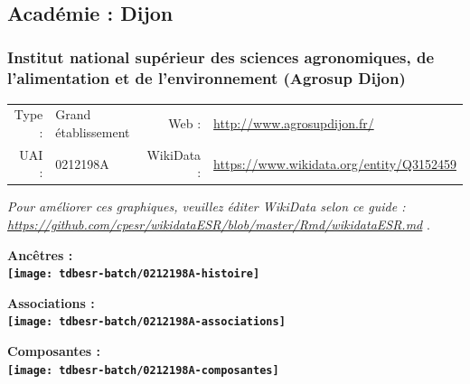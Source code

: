 \documentclass[12pt,french,]{article}
\begin{document}
\ifoddpage \fi ~\newpage  

\hypertarget{acaduxe9mie-dijon-1}{%
\subsection{Académie : Dijon}\label{acaduxe9mie-dijon-1}}

\hypertarget{institut-national-supuxe9rieur-des-sciences-agronomiques-de-lalimentation-et-de-lenvironnement-agrosup-dijon}{%
\subsubsection{Institut national supérieur des sciences agronomiques, de
l'alimentation et de l'environnement (Agrosup
Dijon)}\label{institut-national-supuxe9rieur-des-sciences-agronomiques-de-lalimentation-et-de-lenvironnement-agrosup-dijon}}

\begin{tabular*}{\textwidth}{rp{5cm}rl}  
\hline  
Type : & Grand établissement & Web : &\href{http://www.agrosupdijon.fr/}{http://www.agrosupdijon.fr/} \\  
UAI : & 0212198A & WikiData : & \href{https://www.wikidata.org/entity/Q3152459}{https://www.wikidata.org/entity/Q3152459} \\  
\hline  
\end{tabular*}

\textit{\scriptsize Pour améliorer ces graphiques, veuillez éditer WikiData selon ce guide :  \href{https://github.com/cpesr/wikidataESR/blob/master/Rmd/wikidataESR.md}{https://github.com/cpesr/wikidataESR/blob/master/Rmd/wikidataESR.md}}
.

\vspace{1cm}  
\begin{minipage}[b]{0.50\textwidth}\begin{center} \bf Ancêtres : \\  
\texttt{[image: tdbesr-batch/0212198A-histoire]} \end{center}\end{minipage}\begin{minipage}[b]{0.50\textwidth}\begin{center} \bf Associations : \\  
\texttt{[image: tdbesr-batch/0212198A-associations]} \end{center}\end{minipage}

\hrulefill

\begin{center} \bf Composantes : \\  
\texttt{[image: tdbesr-batch/0212198A-composantes]} \end{center}
\end{document}
